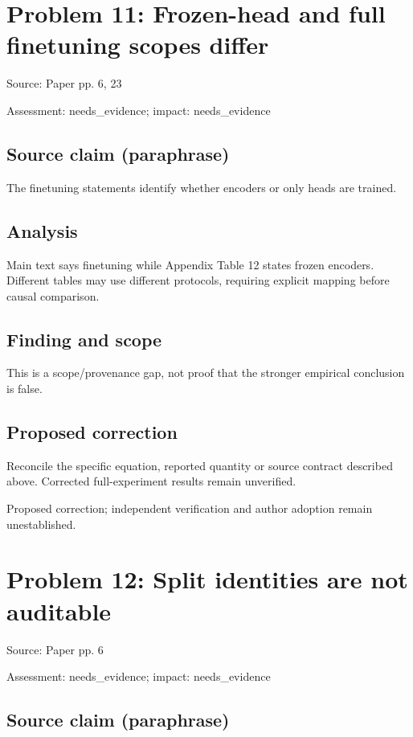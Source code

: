 \documentclass[11pt]{article}
\begin{document}
\section*{Problem 11: Frozen-head and full finetuning scopes differ}

Source: Paper pp. 6, 23

Assessment: needs\_evidence; impact: needs\_evidence

\subsection*{Source claim (paraphrase)}

The finetuning statements identify whether encoders or only heads are trained.

\subsection*{Analysis}

Main text says finetuning while Appendix Table 12 states frozen encoders. Different tables may use different protocols, requiring explicit mapping before causal comparison.

\subsection*{Finding and scope}

This is a scope/provenance gap, not proof that the stronger empirical conclusion is false.

\subsection*{Proposed correction}

Reconcile the specific equation, reported quantity or source contract described above. Corrected full-experiment results remain unverified.

Proposed correction; independent verification and author adoption remain unestablished.

\section*{Problem 12: Split identities are not auditable}

Source: Paper pp. 6

Assessment: needs\_evidence; impact: needs\_evidence

\subsection*{Source claim (paraphrase)}
\end{document}
